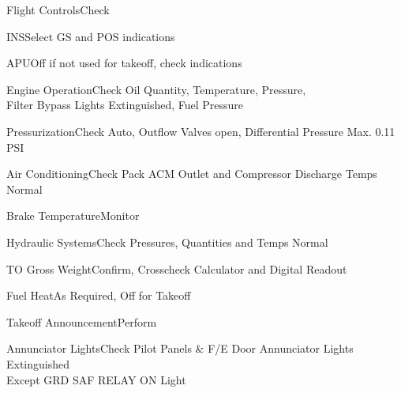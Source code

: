\documentclass[sim-use, blue_items]{checklist}
\begin{document}
\begin{continuedchecklist}
	\item{Flight Controls}{Check}
	\item{INS}{Select GS and POS indications}
	\item{APU}{Off if not used for takeoff, check indications}
	\item{Engine Operation}{Check Oil Quantity, Temperature, Pressure,\\Filter Bypass Lights Extinguished, Fuel Pressure}
	\item{Pressurization}{Check Auto, Outflow Valves open, Differential Pressure Max. 0.11 PSI}
	\item{Air Conditioning}{Check Pack ACM Outlet and Compressor Discharge Temps Normal}
	\item{Brake Temperature}{Monitor}
	\item{Hydraulic Systems}{Check Pressures, Quantities and Temps Normal}
	\item{TO Gross Weight}{Confirm, Crosscheck Calculator and Digital Readout}
	\item{Fuel Heat}{As Required, Off for Takeoff}
	\item{Takeoff Announcement}{Perform}
	\item{Annunciator Lights}{Check Pilot Panels \& F/E Door Annunciator Lights Extinguished\\Except GRD SAF RELAY ON Light} %
\end{continuedchecklist}
\end{document}
